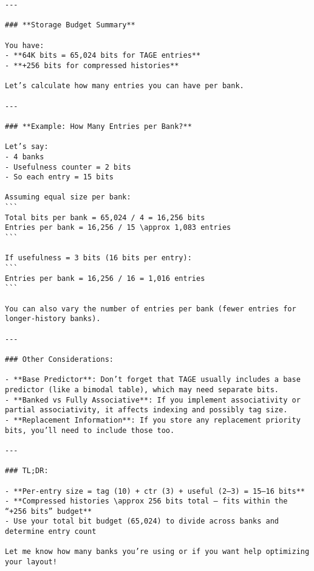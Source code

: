 \documentclass[sigconf, screen]{acmart}
\begin{document}
\begin{Verbatim}[fontsize=\tiny, breaklines=true]
---

### **Storage Budget Summary**

You have:
- **64K bits = 65,024 bits for TAGE entries**
- **+256 bits for compressed histories**

Let’s calculate how many entries you can have per bank.

---

### **Example: How Many Entries per Bank?**

Let’s say:
- 4 banks
- Usefulness counter = 2 bits
- So each entry = 15 bits

Assuming equal size per bank:
```
Total bits per bank = 65,024 / 4 = 16,256 bits
Entries per bank = 16,256 / 15 \approx 1,083 entries
```

If usefulness = 3 bits (16 bits per entry):
```
Entries per bank = 16,256 / 16 = 1,016 entries
```

You can also vary the number of entries per bank (fewer entries for longer-history banks).

---

### Other Considerations:

- **Base Predictor**: Don’t forget that TAGE usually includes a base predictor (like a bimodal table), which may need separate bits.
- **Banked vs Fully Associative**: If you implement associativity or partial associativity, it affects indexing and possibly tag size.
- **Replacement Information**: If you store any replacement priority bits, you’ll need to include those too.

---

### TL;DR:

- **Per-entry size = tag (10) + ctr (3) + useful (2–3) = 15–16 bits**
- **Compressed histories \approx 256 bits total — fits within the “+256 bits” budget**
- Use your total bit budget (65,024) to divide across banks and determine entry count

Let me know how many banks you’re using or if you want help optimizing your layout!
\end{Verbatim}
\end{document}
